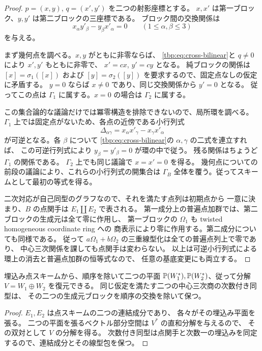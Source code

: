 \begin{proof}
$p=(x,y)$, $q=(x',y')$ を二つの射影座標とする。
$x,x'$ は第一ブロック、$y,y'$ は第二ブロックの三座標である。
ブロック間の交換関係は
\begin{equation}\label{tbp:eq:cross-bilinear}
 x_\alpha y'_\beta-y_\beta x'_\alpha=0
 \qquad(1\leq\alpha,\beta\leq3)
\end{equation}
を与える。

まず幾何点を調べる。$x,y$ がともに非零ならば、
\eqref{tbp:eq:cross-bilinear}と $q\ne0$ により $x',y'$ もともに非零で、
$x'=c x$, $y'=c y$ となる。
純ブロックの関係は $[x]=\sigma_1([x])$ および
$[y]=\sigma_2([y])$ を要求するので、固定点なしの仮定に矛盾する。
$y=0$ ならば $x\ne0$ であり、同じ交換関係から $y'=0$ となる。
従ってこの点は $\Gamma_1$ に属する。$x=0$ の場合は $\Gamma_2$ に属する。

この集合論的な議論だけでは冪零構造を排除できないので、局所環を調べる。
$\Gamma_1$ 上では固定点がないため、各点の近傍である小行列式
\[
 \Delta_{\alpha\gamma}
   =x_\alpha x'_\gamma-x_\gamma x'_\alpha
\]
が可逆となる。各 $\beta$ について
\eqref{tbp:eq:cross-bilinear}の $\alpha,\gamma$ の二式を連立すれば、
この可逆行列式により $y_\beta=y'_\beta=0$ が環の中で従う。
残る関係はちょうど $\Gamma_1$ の関係である。
$\Gamma_2$ 上でも同じ議論で $x=x'=0$ を得る。
幾何点についての前段の議論により、これらの小行列式の開集合は
$\Gamma_B$ 全体を覆う。従ってスキームとして最初の等式を得る。

二次対応が自己同型のグラフなので、それを満たす点列は初期点から
一意に決まり、$B$ の点関手は $E_1\amalg E_2$ で表される。
第一成分上の普遍点加群では、第二ブロックの生成元は全て零に作用し、
第一ブロックの $\Omega_1$ も twisted homogeneous coordinate ring への
商表示により零に作用する。第二成分についても同様である。
従って $a\Omega_1+b\Omega_2$ の三重線型化は全ての普遍点列上で零であり、
中心三次関係を課しても点関手は変わらない。
以上は可逆小行列式による環上の消去と普遍点加群の恒等式なので、
任意の基底変更にも両立する。
\end{proof}

\begin{corollary}[埋込み点対応による二つのブロックの認識]
\label{tbp:cor:block-spans}
埋込み点スキームから、順序を除いて二つの平面
$\mathbb P(W_1^*),\mathbb P(W_2^*)$、従って分解 $V=W_1\oplus W_2$ を復元できる。
同じ仮定を満たす二つの中心三次商の次数付き同型は、
その二つの生成元ブロックを順序の交換を除いて保つ。
\end{corollary}

\begin{proof}
$E_1,E_2$ は点スキームの二つの連結成分であり、
各々がその埋込み平面を張る。
二つの平面を張るベクトル部分空間は $V^*$ の直和分解を与えるので、
その双対として $V$ の分解を得る。
次数付き同型は点関手と次数一の埋込みを同定するので、連結成分とその線型包を保つ。
\end{proof}

